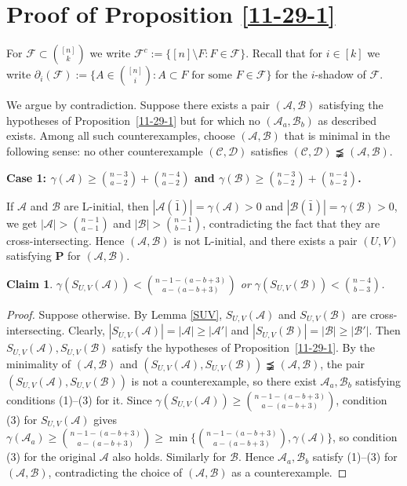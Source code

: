 \documentclass[11pt]{article}
\def\marrow{{\boldmath {\marginpar[\hfill$\rightarrow \rightarrow$]{$\leftarrow \leftarrow$}}}}
\def\andrey#1{{\sc Andrey: }{\marrow\sf \textcolor{blue}{#1}}}
\newcommand{\m}{\mathcal}
\newtheorem{claim}[theorem]{Claim}
\begin{document}
 
\section{Proof of Proposition \ref{11-29-1}}\label{secpro2}
For $\mathcal{F}\subset\binom{[n]}{k}$ we write 
$\mathcal{F}^c:=\{[n]\setminus F:F\in\mathcal{F}\}$. Recall that for  $i\in[k]$ we write 
$\partial_i(\mathcal{F}):=\{A\in\binom{[n]}{i}:A\subset F\text{ for some }F\in\mathcal{F}\}$ 
for the $i$-shadow of $\mathcal{F}$.


We argue by contradiction. Suppose there exists a pair $(\mathcal{A},\mathcal{B})$ satisfying the hypotheses of Proposition~\ref{11-29-1} but for which no $(\mathcal{A}_a,\mathcal{B}_b)$ as described exists. Among all such counterexamples, choose $(\mathcal{A},\mathcal{B})$ that is minimal in the following sense: no other counterexample $(\mathcal{C},\mathcal{D})$ satisfies $(\mathcal{C},\mathcal{D})\precneqq(\mathcal{A},\mathcal{B})$.

{\bf Case 1: $\gamma(\mathcal{A})\ge {n-3\choose a-2}+{n-4\choose a-2}$ and $\gamma(\mathcal{B})\ge {n-3\choose b-2}+{n-4\choose b-2}$.}

If $\m A$ and $\m B$ are L-initial, then
$|\m A(\bar1)|=\gamma(\m A)>0$ and $|\m B(\bar1)|=\gamma(\m B)>0$, 
we get $|\m A|>{n-1\choose a-1}$ and $|\m B|>{n-1\choose b-1}$, contradicting the fact that they are cross-intersecting.  
Hence $(\m A, \m B)$ is not L-initial, and there exists a pair $(U,V)$ satisfying {\bf P} for $(\m A, \m B)$. 

\begin{claim}\label{keyclaim}
 $\gamma(S_{U,V}(\m A))<{n-1-(a-b+3)\choose a-(a-b+3)}$ or $\gamma(S_{U,V}(\m B))<{n-4\choose b-3}$.
\end{claim}

\begin{proof}
Suppose otherwise.  
By Lemma \ref{SUV}, $S_{U,V}(\mathcal{A})$ and $ S_{U,V}(\mathcal{B})$ are cross-intersecting. 
Clearly, $|S_{U,V}(\m A)|=|\m A|\ge |\m A'|$ and $|S_{U,V}(\m B)|=|\m B|\ge |\m B'|$. Then $S_{U,V}(\m A), S_{U,V}(\m B)$ satisfy the hypotheses of Proposition~\ref{11-29-1}. By the minimality of $(\mathcal{A},\mathcal{B})$ and $(S_{U,V}(\mathcal{A}),S_{U,V}(\mathcal{B}))\precneqq(\mathcal{A},\mathcal{B})$, the pair $(S_{U,V}(\mathcal{A}),S_{U,V}(\mathcal{B}))$ is not a counterexample, so there exist $\mathcal{A}_a,\mathcal{B}_b$ satisfying conditions (1)–(3) for it.
Since $\gamma(S_{U,V}(\mathcal{A}))\ge\binom{n-1-(a-b+3)}{a-(a-b+3)}$, condition (3) for $S_{U,V}(\mathcal{A})$ gives $\gamma(\mathcal{A}_a)\ge\binom{n-1-(a-b+3)}{a-(a-b+3)}\ge\min\{\binom{n-1-(a-b+3)}{a-(a-b+3)},\gamma(\mathcal{A})\}$, so condition (3) for the original $\mathcal{A}$ also holds. Similarly for $\mathcal{B}$. Hence $\mathcal{A}_a,\mathcal{B}_b$ satisfy (1)–(3) for $(\mathcal{A},\mathcal{B})$, contradicting the choice of $(\mathcal{A},\mathcal{B})$ as a counterexample.
\end{proof}
\end{document}
